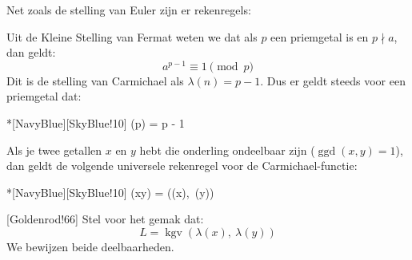 Net zoals de stelling van Euler zijn er rekenregels:


Uit de Kleine Stelling van Fermat weten we dat als $p$ een priemgetal is en $p \nmid a$, dan geldt:
\begin{equation*}
    a^{p-1} \equiv 1 \pmod p
\end{equation*}
Dit is de stelling van Carmichael als $\lambda(n) = p-1$. Dus er geldt steeds voor een priemgetal dat:
\begin{equationbox}*[NavyBlue][SkyBlue!10]
    \lambda(p) = p - 1
\end{equationbox}


Als je twee getallen $x$ en $y$ hebt die onderling ondeelbaar zijn ($\operatorname{ggd}(x, y) = 1$), dan geldt de volgende universele rekenregel voor de Carmichael-functie:
\begin{equationbox}*[NavyBlue][SkyBlue!10]
    \lambda(xy) = \left(\lambda(x),\ \lambda(y)\right)
\end{equationbox}

[Goldenrod!66] Stel voor het gemak dat:
\begin{equation*}
    L = \operatorname{kgv}\left(\lambda(x),\ \lambda(y)\right)
\end{equation*}
We bewijzen beide deelbaarheden.

